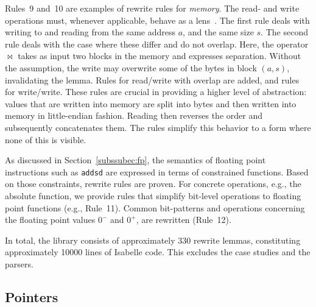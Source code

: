 Rules~9 and~10 are examples of rewrite rules for \emph{memory}.
The read- and write operations must, whenever applicable, behave as a lens~\cite{foster2009bidirectional}. 
The first rule deals with writing to and reading from the same address $a$, and the same size $s$.
The second rule deals with the case where these differ and do not overlap.
Here, the operator $\bowtie$ takes as input two blocks in the memory and expresses separation.
Without the assumption, the write may overwrite some of the bytes in block $(a,s)$, invalidating the lemma.
Rules for read/write with overlap are added, and rules for write/write.
These rules are crucial in providing a higher level of abstraction: values that are written into memory are split into bytes and then written into memory in little-endian fashion.
Reading then reverses the order and subsequently concatenates them.
The rules simplify this behavior to a form where none of this is visible.

As discussed in Section~\ref{subssubec:fp}, the semantics of floating point instructions such as \texttt{addsd} are expressed in terms of constrained functions.
Based on those constraints, rewrite rules are proven.
For concrete operations, e.g., the absolute function, we provide rules that simplify bit-level operations to floating point functions (e.g., Rule~11).
Common bit-patterns and operations concerning the floating point values $0^-$ and $0^+$, are rewritten (Rule~12).

In total, the library consists of approximately 330 rewrite lemmas, constituting approximately 10000 lines of Isabelle code.
This excludes the case studies and the parsers. 



\subsection{Pointers}

